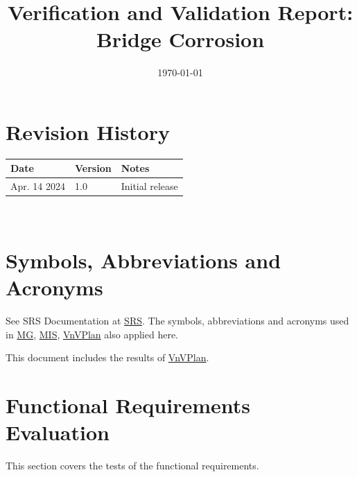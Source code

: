 \documentclass[12pt, titlepage]{article}
\begin{document}
\title{Verification and Validation Report: Bridge Corrosion} 
\author{\authname}
\date{\today}
	
\maketitle


\section{Revision History}

\begin{tabularx}{\textwidth}{p{3cm}p{2cm}X}
\toprule {\bf Date} & {\bf Version} & {\bf Notes}\\
\midrule
Apr. 14 2024 & 1.0 & Initial release\\
\bottomrule
\end{tabularx}

~\newpage

\section{Symbols, Abbreviations and Acronyms}
    
See SRS Documentation at \href{https://smiths.github.io/BridgeChlorideExposurePredictor/SRS/SRS.pdf}{SRS}.
The symbols, abbreviations and acronyms used in \href{https://smiths.github.io/BridgeChlorideExposurePredictor/Design/SoftArchitecture/MG.pdf}{MG}, \href{https://smiths.github.io/BridgeChlorideExposurePredictor/Design/SoftDetailedDes/MIS.pdf}{MIS}, \href{https://smiths.github.io/BridgeChlorideExposurePredictor/VnVPlan/VnVPlan.pdf}{VnVPlan} also applied here.



\newpage

\tableofcontents

\listoftables %


\newpage


This document includes the results of \href{https://smiths.github.io/BridgeChlorideExposurePredictor/VnVPlan/VnVPlan.pdf}{VnVPlan}. 

\section{Functional Requirements Evaluation}\label{FRE}
This section covers the tests of the functional requirements.
\end{document}
